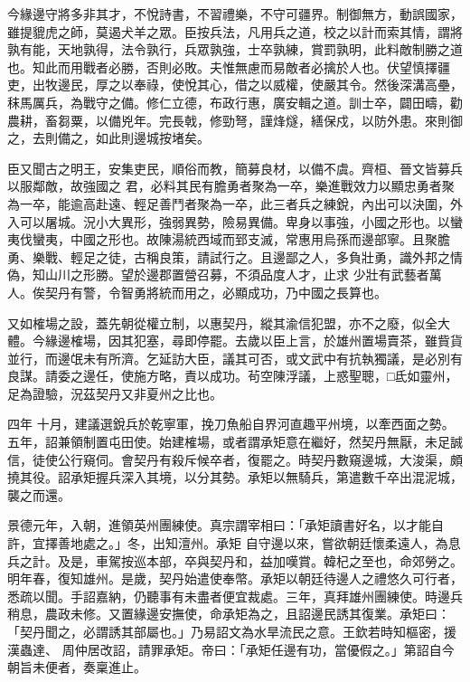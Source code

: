 \begin{pinyinscope}
 今緣邊守將多非其才，不悅詩書，不習禮樂，不守可疆界。制御無方，動誤國家，雖提貔虎之師，莫遏犬羊之眾。臣按兵法，凡用兵之道，校之以計而索其情，謂將孰有能，天地孰得，法令孰行，兵眾孰強，士卒孰練，賞罰孰明，此料敵制勝之道
 也。知此而用戰者必勝，否則必敗。夫惟無慮而易敵者必擒於人也。伏望慎擇疆吏，出牧邊民，厚之以奉祿，使悅其心，借之以威權，使嚴其令。然後深溝高壘，秣馬厲兵，為戰守之備。修仁立德，布政行惠，廣安輯之道。訓士卒，闢田疇，勸農耕，畜芻粟，以備兇年。完長戟，修勁弩，謹烽燧，繕保戍，以防外患。來則御之，去則備之，如此則邊城按堵矣。



 臣又聞古之明王，安集吏民，順俗而教，簡募良材，以備不虞。齊桓、晉文皆募兵以服鄰敵，故強國之
 君，必料其民有膽勇者聚為一卒，樂進戰效力以顯忠勇者聚為一卒，能逾高赴遠、輕足善鬥者聚為一卒，此三者兵之練銳，內出可以決圍，外入可以屠城。況小大異形，強弱異勢，險易異備。卑身以事強，小國之形也。以蠻夷伐蠻夷，中國之形也。故陳湯統西域而郅支滅，常惠用烏孫而邊部寧。且聚膽勇、樂戰、輕足之徒，古稱良策，請試行之。且邊鄙之人，多負壯勇，識外邦之情偽，知山川之形勝。望於邊郡置營召募，不須品度人才，止求
 少壯有武藝者萬人。俟契丹有警，令智勇將統而用之，必顯成功，乃中國之長算也。



 又如榷場之設，蓋先朝從權立制，以惠契丹，縱其渝信犯盟，亦不之廢，似全大體。今緣邊榷場，因其犯塞，尋即停罷。去歲以臣上言，於雄州置場賣茶，雖貲貨並行，而邊氓未有所濟。乞延訪大臣，議其可否，或文武中有抗執獨議，是必別有良謀。請委之邊任，使施方略，責以成功。茍空陳浮議，上惑聖聰，□氐如靈州，足為證驗，況茲契丹又非夏州之比也。



 四年
 十月，建議選銳兵於乾寧軍，挽刀魚船自界河直趣平州境，以牽西面之勢。五年，詔兼領制置屯田使。始建榷場，或者謂承矩意在繼好，然契丹無厭，未足誠信，徒使公行窺伺。會契丹有殺斥候卒者，復罷之。時契丹數窺邊城，大浚渠，頗撓其役。詔承矩握兵深入其境，以分其勢。承矩以無騎兵，第遣數千卒出混泥城，襲之而還。



 景德元年，入朝，進領英州團練使。真宗謂宰相曰：「承矩讀書好名，以才能自許，宜擇善地處之。」冬，出知澶州。承矩
 自守邊以來，嘗欲朝廷懷柔遠人，為息兵之計。及是，車駕按巡本部，卒與契丹和，益加嘆賞。韓杞之至也，命郊勞之。明年春，復知雄州。是歲，契丹始遣使奉幣。承矩以朝廷待邊人之禮悠久可行者，悉疏以聞。手詔嘉納，仍聽事有未盡者便宜裁處。三年，真拜雄州團練使。時邊兵稍息，農政未修。又置緣邊安撫使，命承矩為之，且詔邊民誘其復業。承矩曰：「契丹聞之，必謂誘其部屬也。」乃易詔文為水旱流民之意。王欽若時知樞密，援漢蟲達、
 周仲居改詔，請罪承矩。帝曰：「承矩任邊有功，當優假之。」第詔自今朝旨未便者，奏稟進止。




\end{pinyinscope}
